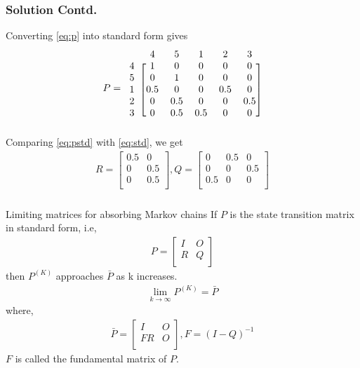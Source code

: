 \documentclass{beamer}
\begin{document}
\begin{frame}
\frametitle{Solution Contd.}
Converting \eqref{eq:p} into standard form gives
\begin{align}
\label{eq:pstd}
    P=\begin{blockarray}{cccccc}
&4 & 5 & 1 & 2 & 3 \\
\begin{block}{c[ccccc]}
  4 & 1 & 0 & 0 & 0 & 0 \\
  5 & 0 & 1 & 0 & 0 & 0 \\
  1 & 0.5 & 0 & 0 & 0.5 & 0 \\
  2 & 0 & 0.5 & 0 & 0 & 0.5 \\
  3 & 0 & 0.5 & 0.5 & 0 & 0 \\
\end{block}
\end{blockarray}
\end{align}
Comparing \eqref{eq:pstd} with \eqref{eq:std}, we get
\begin{align}
\label{eq:r,q}
    R=\begin{bmatrix}
    0.5 & 0\\
    0 & 0.5\\
    0 & 0.5\\
    \end{bmatrix},
    Q=\begin{bmatrix}
    0 & 0.5 & 0\\
    0 & 0 & 0.5\\
    0.5 & 0 & 0\\
    \end{bmatrix}
\end{align}
\end{frame}

\begin{frame}
\frametitle{}
    \begin{block}{Limiting matrices for absorbing Markov chains}
    If $P$ is the state transition matrix in standard form, i.e,
    \begin{align}
         P=\begin{bmatrix}
    I & O\\
    R & Q\\
    \end{bmatrix}
    \end{align}
    then $P^{(K)}$ approaches $\bar P$ as k increases. 
    \begin{align}
        \displaystyle\lim_{k\to\infty}P^{(K)}=\bar P
    \end{align}
    where,
    \begin{align}
        \label{eq:pbar}
    \bar P=\begin{bmatrix}
    I & O\\
    FR & O\\
    \end{bmatrix},
    F=(I-Q)^{-1}
    \end{align}
    $F$ is called the fundamental matrix of $P$.  
    \end{block}
\end{frame}
\end{document}
